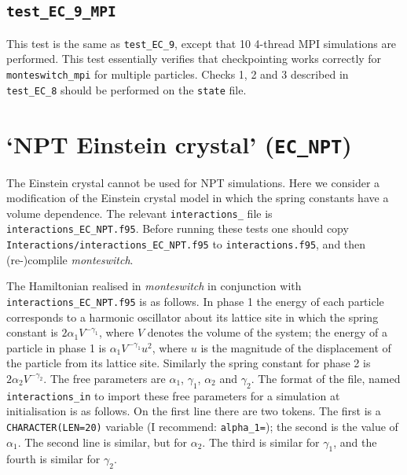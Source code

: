 \documentclass{report}
\begin{document}
\subsection{\texttt{test\_EC\_9\_MPI}}
This test is the same as \texttt{test\_EC\_9}, except that 10 4-thread MPI simulations are performed. This test essentially verifies 
that checkpointing works correctly for \texttt{monteswitch\_mpi} for multiple particles. Checks 1, 2 and 3 described in \texttt{test\_EC\_8} should be 
performed on the \texttt{state} file.




\section{`NPT Einstein crystal' (\texttt{EC\_NPT})}
The Einstein crystal cannot be used for NPT simulations. Here we consider a modification of the Einstein
crystal model in which the spring constants have a volume dependence. The relevant \texttt{interactions\_} file is 
\texttt{interactions\_EC\_NPT.f95}.  Before running these tests one should copy 
\texttt{Interactions/interactions\_EC\_NPT.f95} to \texttt{interactions.f95}, and then (re-)complile 
\emph{monteswitch}.

The Hamiltonian realised in \emph{monteswitch} in conjunction with \texttt{interactions\_EC\_NPT.f95} is 
as follows. In phase 1 the energy of each particle corresponds to a harmonic oscillator about its
lattice site in which the spring constant is $2\alpha_1V^{-\gamma_1}$, where $V$ denotes the volume of 
the system; the energy of a particle in phase 1 is $\alpha_1V^{-\gamma_1}u^2$, where $u$ is the magnitude of the displacement
of the particle from its lattice site. Similarly the spring constant for phase 2 is $2\alpha_2V^{-\gamma_2}$.
The free parameters are $\alpha_1$, $\gamma_1$, $\alpha_2$ and $\gamma_2$.
The format of the file, named \texttt{interactions\_in} to import these free parameters for a simulation at initialisation
is as follows. On the first line there are two tokens. The first is a \texttt{CHARACTER(LEN=20)} variable (I recommend: \texttt{alpha\_1=});
the second is the value of $\alpha_1$. The second line is similar, but for $\alpha_2$. The third is similar for $\gamma_1$, 
and the fourth is similar for $\gamma_2$.
\end{document}
